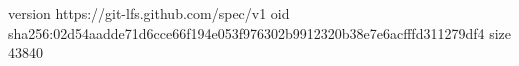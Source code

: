version https://git-lfs.github.com/spec/v1
oid sha256:02d54aadde71d6cce66f194e053f976302b9912320b38e7e6acfffd311279df4
size 43840
